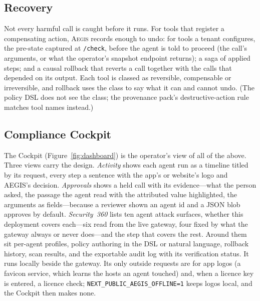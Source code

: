 \documentclass[sigconf,nonacm]{acmart}
\newcommand{\system}{\textsc{Aegis}\xspace}
\begin{document}
\subsection{Recovery}
\label{sec:recovery}

Not every harmful call is caught before it runs. For tools that register
a compensating action, \system records enough to undo: for tools a tenant configures, the pre-state captured at \texttt{/check}, before the agent is told to proceed (the call's arguments, or what the operator's snapshot endpoint returns); a saga of applied steps; and a causal rollback that reverts a call together with the calls that depended on its output. Each tool is classed as reversible, compensable or irreversible, and rollback uses the class to say what it can and cannot undo. (The policy DSL does not see the class; the provenance pack's destructive-action rule matches tool names instead.)









\subsection{Compliance Cockpit}
\label{sec:cockpit}

The Cockpit (Figure~\ref{fig:dashboard}) is the operator's view of all of
the above. Three views carry the design. \emph{Activity} shows each agent
run as a timeline titled by its request, every step a sentence with the
app's or website's logo and AEGIS's decision. \emph{Approvals} shows a
held call with its evidence---what the person asked, the passage the
agent read with the attributed value highlighted, the arguments as
fields---because a reviewer shown an agent id and a JSON blob approves
by default. \emph{Security~360} lists ten agent attack surfaces, whether this
deployment covers each---six read from the live gateway, four fixed by
what the gateway always or never does---and the step that covers the
rest. Around them sit per-agent profiles, policy authoring in
the DSL or natural language, rollback history, scan results, and the
exportable audit log with its verification status. It runs locally
beside the gateway. Its only outside requests are for app logos (a
favicon service, which learns the hosts an agent touched) and, when a
licence key is entered, a licence check; \texttt{NEXT\_PUBLIC\_AEGIS\_OFFLINE=1}
keeps logos local, and the Cockpit then makes none.
\end{document}
